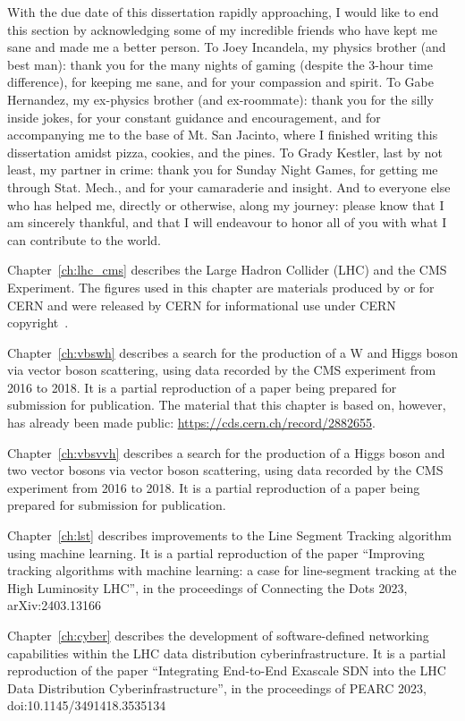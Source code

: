 \begin{acknowledgements}
With the due date of this dissertation rapidly approaching, I would like to end this section by acknowledging some of my incredible friends who have kept me sane and made me a better person. 
To Joey Incandela, my physics brother (and best man): thank you for the many nights of gaming (despite the 3-hour time difference), for keeping me sane, and for your compassion and spirit. 
To Gabe Hernandez, my ex-physics brother (and ex-roommate): thank you for the silly inside jokes, for your constant guidance and encouragement, and for accompanying me to the base of Mt. San Jacinto, where I finished writing this dissertation amidst pizza, cookies, and the pines. 
To Grady Kestler, last by not least, my partner in crime: thank you for Sunday Night Games, for getting me through Stat. Mech., and for your camaraderie and insight. 
And to everyone else who has helped me, directly or otherwise, along my journey: please know that I am sincerely thankful, and that I will endeavour to honor all of you with what I can contribute to the world. 

Chapter~\ref{ch:lhc_cms} describes the Large Hadron Collider (LHC) and the CMS Experiment. 
The figures used in this chapter are materials produced by or for CERN and were released by CERN for informational use under CERN copyright~\cite{CERNCopyright}. 

Chapter~\ref{ch:vbswh} describes a search for the production of a W and Higgs boson via vector boson scattering, using data recorded by the CMS experiment from 2016 to 2018. 
It is a partial reproduction of a paper being prepared for submission for publication. 
The material that this chapter is based on, however, has already been made public: \url{https://cds.cern.ch/record/2882655}.

Chapter~\ref{ch:vbsvvh} describes a search for the production of a Higgs boson and two vector bosons via vector boson scattering, using data recorded by the CMS experiment from 2016 to 2018. 
It is a partial reproduction of a paper being prepared for submission for publication. 

Chapter~\ref{ch:lst} describes improvements to the Line Segment Tracking algorithm using machine learning. 
It is a partial reproduction of the paper ``Improving tracking algorithms with machine learning: a case for line-segment tracking at the High Luminosity LHC'', in the proceedings of Connecting the Dots 2023, arXiv:2403.13166

Chapter~\ref{ch:cyber} describes the development of software-defined networking capabilities within the LHC data distribution cyberinfrastructure. 
It is a partial reproduction of the paper ``Integrating End-to-End Exascale SDN into the LHC Data Distribution Cyberinfrastructure'', in the proceedings of PEARC 2023, doi:10.1145/3491418.3535134

\end{acknowledgements}
